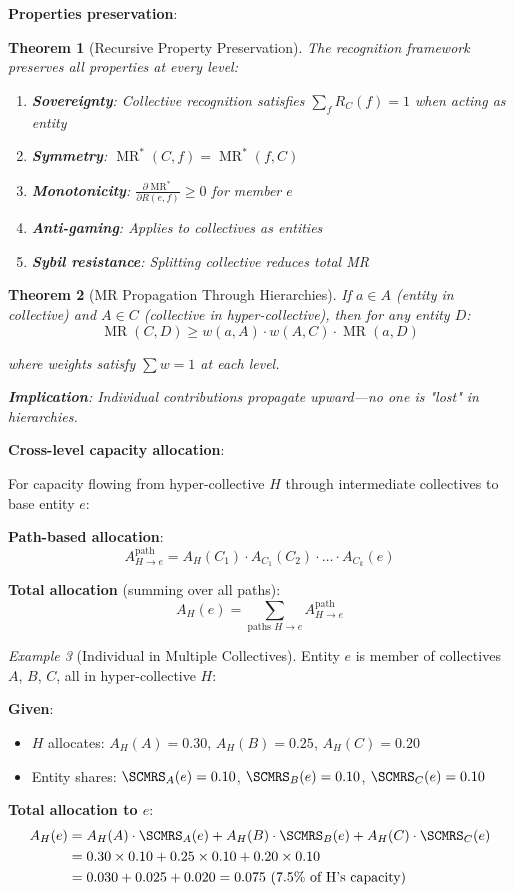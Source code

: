 \documentclass[11pt,a4paper]{article}
\newtheorem{theorem}{Theorem}[section]
\theoremstyle{definition}
\theoremstyle{remark}
\newtheorem{example}[theorem]{Example}
\DeclareMathOperator{\MR}{MR}
\begin{document}
\textbf{Properties preservation}:

\begin{theorem}[Recursive Property Preservation]
The recognition framework preserves all properties at every level:
\begin{enumerate}
\item \textbf{Sovereignty}: Collective recognition satisfies $\sum_f R_C(f) = 1$ when acting as entity
\item \textbf{Symmetry}: $\MR^*(C,f) = \MR^*(f,C)$
\item \textbf{Monotonicity}: $\frac{\partial \MR^*}{\partial R(e,f)} \ge 0$ for member $e$
\item \textbf{Anti-gaming}: Applies to collectives as entities
\item \textbf{Sybil resistance}: Splitting collective reduces total MR
\end{enumerate}
\end{theorem}

\begin{theorem}[MR Propagation Through Hierarchies]
If $a \in A$ (entity in collective) and $A \in C$ (collective in hyper-collective), then for any entity $D$:
\[ \MR(C,D) \ge w(a,A) \cdot w(A,C) \cdot \MR(a,D) \]

where weights satisfy $\sum w = 1$ at each level.

\textbf{Implication}: Individual contributions propagate upward—no one is "lost" in hierarchies.
\end{theorem}

\textbf{Cross-level capacity allocation}:

For capacity flowing from hyper-collective $H$ through intermediate collectives to base entity $e$:

\textbf{Path-based allocation}:
\[ A_{H \to e}^{\text{path}} = A_H(C_1) \cdot A_{C_1}(C_2) \cdot \ldots \cdot A_{C_k}(e) \]

\textbf{Total allocation} (summing over all paths):
\[ A_H(e) = \sum_{\text{paths } H \to e} A_{H \to e}^{\text{path}} \]

\begin{example}[Individual in Multiple Collectives]
Entity $e$ is member of collectives $A$, $B$, $C$, all in hyper-collective $H$:

\textbf{Given}:
\begin{itemize}
\item $H$ allocates: $A_H(A) = 0.30$, $A_H(B) = 0.25$, $A_H(C) = 0.20$
\item Entity shares: $\SCMRS_A(e) = 0.10$, $\SCMRS_B(e) = 0.10$, $\SCMRS_C(e) = 0.10$
\end{itemize}

\textbf{Total allocation to $e$}:
\begin{align*}
A_H(e) &= A_H(A) \cdot \SCMRS_A(e) + A_H(B) \cdot \SCMRS_B(e) + A_H(C) \cdot \SCMRS_C(e) \\
&= 0.30 \times 0.10 + 0.25 \times 0.10 + 0.20 \times 0.10 \\
&= 0.030 + 0.025 + 0.020 = 0.075 \text{ (7.5\% of H's capacity)}
\end{align*}
\end{example}
\end{document}
